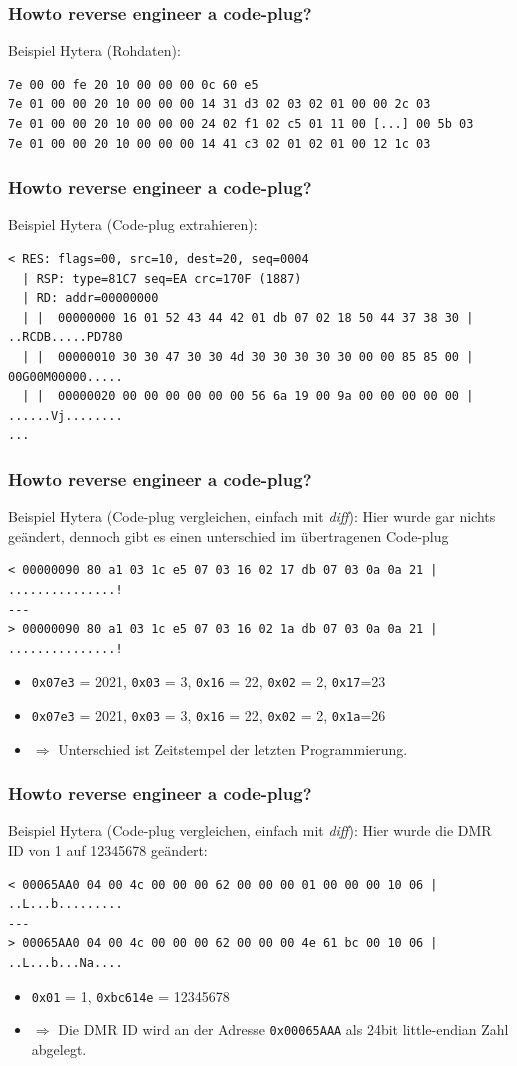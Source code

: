 \documentclass[aspectratio=169]{beamer}
\begin{document}
\begin{frame}[fragile]\frametitle{Howto reverse engineer a code-plug?}
Beispiel Hytera (Rohdaten):
\begin{verbatim}
7e 00 00 fe 20 10 00 00 00 0c 60 e5
7e 01 00 00 20 10 00 00 00 14 31 d3 02 03 02 01 00 00 2c 03    
7e 01 00 00 20 10 00 00 00 24 02 f1 02 c5 01 11 00 [...] 00 5b 03
7e 01 00 00 20 10 00 00 00 14 41 c3 02 01 02 01 00 12 1c 03    
\end{verbatim}
\end{frame}

\begin{frame}[fragile]\frametitle{Howto reverse engineer a code-plug?}
Beispiel Hytera (Code-plug extrahieren):
\begin{lstlisting}
< RES: flags=00, src=10, dest=20, seq=0004
  | RSP: type=81C7 seq=EA crc=170F (1887)
  | RD: addr=00000000
  | |  00000000 16 01 52 43 44 42 01 db 07 02 18 50 44 37 38 30 | ..RCDB.....PD780
  | |  00000010 30 30 47 30 30 4d 30 30 30 30 30 00 00 85 85 00 | 00G00M00000.....
  | |  00000020 00 00 00 00 00 00 56 6a 19 00 9a 00 00 00 00 00 | ......Vj........
...
\end{lstlisting}
\end{frame}

\begin{frame}[fragile]\frametitle{Howto reverse engineer a code-plug?}
Beispiel Hytera (Code-plug vergleichen, einfach mit \emph{diff}):
Hier wurde gar nichts geändert, dennoch gibt es einen unterschied im übertragenen Code-plug
\begin{lstlisting}
< 00000090 80 a1 03 1c e5 07 03 16 02 17 db 07 03 0a 0a 21 | ...............!
---
> 00000090 80 a1 03 1c e5 07 03 16 02 1a db 07 03 0a 0a 21 | ...............!
\end{lstlisting}
\begin{itemize}
 \item \texttt{0x07e3} = 2021, \texttt{0x03} = 3, \texttt{0x16} = 22, \texttt{0x02} = 2, \texttt{0x17}=23
 \item \texttt{0x07e3} = 2021, \texttt{0x03} = 3, \texttt{0x16} = 22, \texttt{0x02} = 2, \texttt{0x1a}=26
 \item $\Rightarrow$ Unterschied ist Zeitstempel der letzten Programmierung.
\end{itemize}
\end{frame}

\begin{frame}[fragile]\frametitle{Howto reverse engineer a code-plug?}
Beispiel Hytera (Code-plug vergleichen, einfach mit \emph{diff}):
Hier wurde die DMR ID von 1 auf 12345678 geändert:
\begin{lstlisting}
< 00065AA0 04 00 4c 00 00 00 62 00 00 00 01 00 00 00 10 06 | ..L...b.........
---
> 00065AA0 04 00 4c 00 00 00 62 00 00 00 4e 61 bc 00 10 06 | ..L...b...Na....
\end{lstlisting}
\begin{itemize}
 \item \texttt{0x01} = 1, \texttt{0xbc614e} = 12345678
 \item $\Rightarrow$ Die DMR ID wird an der Adresse \texttt{0x00065AAA} als 24bit little-endian Zahl abgelegt.
\end{itemize}
\end{frame}
\end{document}
